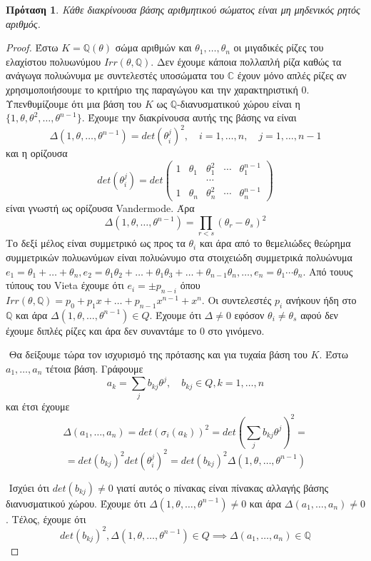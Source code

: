 \documentclass[oneside,a4paper]{article}
\newtheorem{prop}{Πρόταση}
\newcommand {\tl}{\textlatin}
\newcommand{\Q}{\mathbb{Q}}
\begin{document}
\begin{prop}
	Κάθε διακρίνουσα βάσης αριθμητικού σώματος είναι μη μηδενικός ρητός αριθμός.
\end{prop}
\begin{proof}
	Έστω $K=\Q(\theta)$ σώμα αριθμών και $\theta_1,\ldots,\theta_n$ οι μιγαδικές ρίζες του ελαχίστου πολυωνύμου $Irr(\theta,\Q)$. Δεν έχουμε κάποια πολλαπλή ρίζα καθώς τα ανάγωγα πολυώνυμα με συντελεστές υποσώματα του $\mathbb{C}$ έχουν μόνο απλές ρίζες αν χρησιμοποιήσουμε το κριτήριο της παραγώγου και την χαρακτηριστική $0$. Υπενθυμίζουμε ότι μια βάση του $K$ ως $\Q$-διανυσματικού χώρου είναι η $\{1,\theta,\theta^2,\ldots,\theta^{n-1}\}$. Έχουμε την διακρίνουσα αυτής της βάσης να είναι 
	$$\Delta(1,\theta,\ldots,\theta^{n-1}) = det(\theta^j_i)^2, \quad i=1,\ldots,n, \quad j=1,\ldots,n-1$$ και η ορίζουσα $$det(\theta^j_i) = det \begin{pmatrix}
	1 & \theta_1 & \theta^2_1 & \cdots & \theta^{n-1}_1 \\
	 & & \cdots & & \\
	 1 & \theta_n & \theta^2_n & \cdots & \theta^{n-1}_n
	\end{pmatrix}$$ είναι γνωστή ως ορίζουσα \tl{Vandermode}. Άρα $$\Delta(1,\theta,\ldots,\theta^{n-1}) = \prod\limits_{r<s} (\theta_r - \theta_s)^2$$ Το δεξί μέλος είναι συμμετρικό ως προς τα $\theta_i$ και άρα από το θεμελιώδες θεώρημα συμμετρικών πολυωνύμων είναι πολυώνυμο στα στοιχειώδη συμμετρικά πολυώνυμα $e_1 = \theta_1 + \ldots + \theta_n, e_2 = \theta_1 \theta_2 + \ldots + \theta_1 \theta_3 + \ldots + \theta_{n-1}\theta_n,\ldots, e_n = \theta_1 \cdots \theta_n$. Από τουυς τύπους του \tl{Vieta} έχουμε ότι $e_i = \pm p_{n-i}$ όπου $Irr(\theta,\Q) = p_0 + p_1 x + \ldots + p_{n-1}x^{n-1} + x^n$. Οι συντελεστές $p_i$ ανήκουν ήδη στο $\Q$ και άρα $\Delta(1,\theta,\ldots,\theta^{n-1}) \in Q$. Έχουμε ότι $\Delta \neq 0$ εφόσον $\theta_i \neq \theta_s$ αφού δεν έχουμε διπλές ρίζες και άρα δεν συναντάμε το $0$ στο γινόμενο.

	$ $\newline
	Θα δείξουμε τώρα τον ισχυρισμό της πρότασης και για τυχαία βάση του $K$. Έστω $a_1,\ldots,a_n$ τέτοια βάση. Γράφουμε $$a_k = \sum\limits_{j}b_{kj}\theta^j, \quad b_{kj} \in Q, k=1,\ldots,n$$ και έτσι έχουμε $$\Delta(a_1,\ldots,a_n) = det(\sigma_i(a_k))^2 = det\left(\sum\limits_{j} b_{kj}\theta^j\right)^2 = $$
	$$= det(b_{kj})^2 det(\theta^j_i)^2 = det(b_{kj})^2 \Delta(1,\theta,\ldots,\theta^{n-1})$$

	$ $\newline
	Ισχύει ότι $det(b_{kj}) \neq 0$ γιατί αυτός ο πίνακας είναι πίνακας αλλαγής βάσης διανυσματικού χώρου. Έχουμε ότι $\Delta(1,\theta,\ldots,\theta^{n-1})\neq 0$ και άρα $\Delta(a_1,\ldots,a_n) \neq 0$. Τέλος, έχουμε ότι $$det(b_{kj})^2,\Delta(1,\theta,\ldots,\theta^{n-1})\in Q \implies \Delta(a_1,\ldots,a_n) \in \Q$$


\end{proof}
\end{document}
